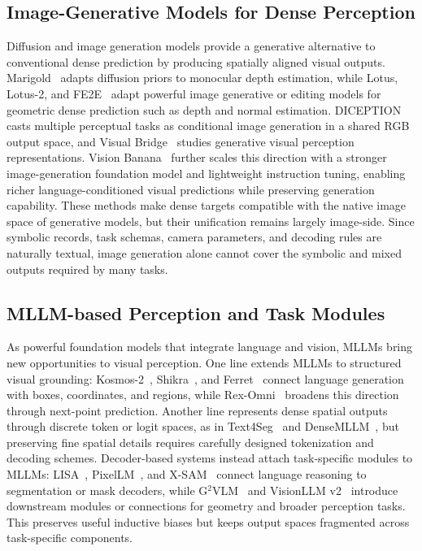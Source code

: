 \subsection{Image-Generative Models for Dense Perception}

Diffusion and image generation models provide a generative alternative to conventional dense prediction by producing spatially aligned visual outputs.
Marigold~\cite{ke2024marigold} adapts diffusion priors to monocular depth estimation, while Lotus, Lotus-2, and FE2E~\cite{lotus,lotus2,fe2e2025editor} adapt powerful image generative or editing models for geometric dense prediction such as depth and normal estimation.
DICEPTION~\cite{diception} casts multiple perceptual tasks as conditional image generation in a shared RGB output space, and Visual Bridge~\cite{visualbridge} studies generative visual perception representations.
Vision Banana~\cite{visionbanana} further scales this direction with a stronger image-generation foundation model and lightweight instruction tuning, enabling richer language-conditioned visual predictions while preserving generation capability.
These methods make dense targets compatible with the native image space of generative models, but their unification remains largely image-side.
Since symbolic records, task schemas, camera parameters, and decoding rules are naturally textual, image generation alone cannot cover the symbolic and mixed outputs required by many tasks.

\subsection{MLLM-based Perception and Task Modules}

As powerful foundation models that integrate language and vision, MLLMs bring new opportunities to visual perception.
One line extends MLLMs to structured visual grounding: Kosmos-2~\cite{kosmos2}, Shikra~\cite{shikra}, and Ferret~\cite{ferret} connect language generation with boxes, coordinates, and regions, while Rex-Omni~\cite{rexomni} broadens this direction through next-point prediction.
Another line represents dense spatial outputs through discrete token or logit spaces, as in Text4Seg~\cite{lan2025text4seg} and DenseMLLM~\cite{densemllm}, but preserving fine spatial details requires carefully designed tokenization and decoding schemes.
Decoder-based systems instead attach task-specific modules to MLLMs: LISA~\cite{lisa}, PixelLM~\cite{pixellm}, and X-SAM~\cite{xsam} connect language reasoning to segmentation or mask decoders, while G$^2$VLM~\cite{g2vlm} and VisionLLM v2~\cite{visionllmv2} introduce downstream modules or connections for geometry and broader perception tasks.
This preserves useful inductive biases but keeps output spaces fragmented across task-specific components.

